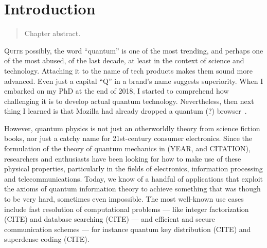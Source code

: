 \chapter{Introduction}
\label{chp:intro}

\begin{refsection}

\begin{abstract}
Chapter abstract.
\end{abstract}

\newpage

\lettrine{Q}{uite} possibly, the word ``quantum'' is one of the most trending, and perhaps one of
the most abused, of the last decade, at least in the context of science and technology. Attaching it
to the name of tech products makes them sound more advanced. Even just a capital ``Q'' in a brand's
name suggests superiority. When I embarked on my PhD at the end of 2018, I started to comprehend how
challenging it is to develop actual quantum technology. Nevertheless, then next thing I learned is
that Mozilla had already dropped a quantum (?) browser~\cite{firefox_quantum}.

However, quantum physics is not just an otherworldly theory from science fiction books, nor just a
catchy name for 21st-century consumer electronics. Since the formulation of the theory of quantum
mechanics in (YEAR, and CITATION), researchers and enthusiasts have been looking for how to make use
of these physical properties, particularly in the fields of electronics, information processing and
telecommunications. Today, we know of a handful of applications that exploit the axioms of quantum
information theory to achieve something that was though to be very hard, sometimes even impossible.
The most well-known use cases include fast resolution of computational problems --- like integer
factorization (CITE) and database searching (CITE) --- and efficient and secure communication
schemes --- for instance quantum key distribution (CITE) and superdense coding (CITE).


\end{refsection}
